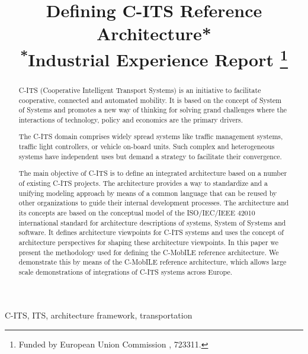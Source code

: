 \documentclass[conference]{IEEEtran}
\begin{document}
\title{Defining C-ITS Reference Architecture* \\
  {\footnotesize \textsuperscript{*}Industrial Experience Report}
  \thanks{Funded by European Union Commission , 723311.}
}

\author{
}

\maketitle


\begin{abstract}
C-ITS (Cooperative Intelligent Transport Systems) is an initiative to facilitate cooperative, connected and automated mobility.
It is based on the concept of System of Systems and promotes a new way of thinking for solving grand challenges where the interactions of technology, policy and economics are the primary drivers.

The C-ITS domain comprises widely spread systems like traffic management systems, traffic light controllers, or vehicle on-board units.
Such complex and heterogeneous systems have independent uses but demand a strategy to facilitate their convergence.

The main objective of C-ITS is to define an integrated architecture based on a number of existing C-ITS projects.
The architecture provides a way to standardize and a unifying modeling approach by means of a common language that can be reused by other organizations to guide their internal development processes.
The architecture and its concepts are based on the conceptual model of the ISO/IEC/IEEE 42010 \cite{iso42010} international standard for architecture descriptions of systems, System of Systems and software.
It defines architecture viewpoints for C-ITS systems and uses the concept of architecture perspectives for shaping these architecture viewpoints.
In this paper we present the methodology used for defining the C-MobILE reference architecture.
We demonstrate this by means of the C-MobILE reference architecture, which allows large scale demonstrations of integrations of C-ITS systems across Europe.
\end{abstract}

\begin{IEEEkeywords}
C-ITS, ITS, architecture framework, transportation
\end{IEEEkeywords}
\end{document}

